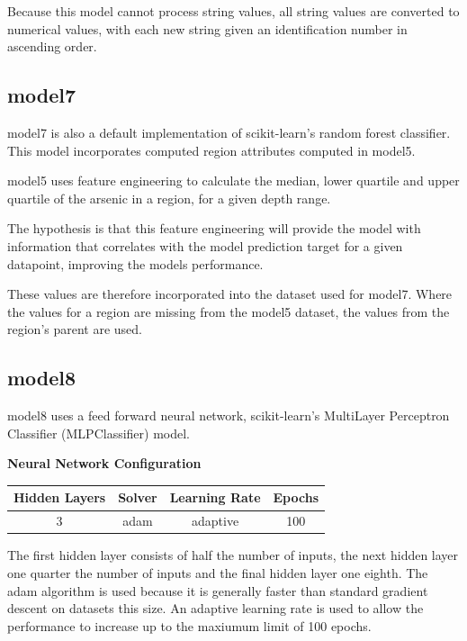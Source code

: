 Because this model cannot process string values, all string values are converted to numerical values, with each new string given an identification number in ascending order.

\subsection{model7}

model7 is also a default implementation of scikit-learn's random forest classifier. This model incorporates computed region attributes computed in model5.

model5 uses feature engineering to calculate the median, lower quartile and upper quartile of the arsenic in a region, for a given depth range.

The hypothesis is that this feature engineering will provide the model with information that correlates with the model prediction target for a given datapoint, improving the models performance.

These values are therefore incorporated into the dataset used for model7. Where the values for a region are missing from the model5 dataset, the values from the region's parent are used.

\subsection{model8}

model8 uses a feed forward neural network, scikit-learn's MultiLayer Perceptron Classifier (MLPClassifier) model.

\textbf{Neural Network Configuration}

\begin{center}
    \begin{tabular}{|c c c c|} 
         \hline
         Hidden Layers & Solver & Learning Rate & Epochs \\ [0.5ex] 
         \hline\hline
         3 & adam & adaptive & 100 \\ 
         \hline
    \end{tabular}
\end{center}

The first hidden layer consists of half the number of inputs, the next hidden layer one quarter the number of inputs and the final hidden layer one eighth. The adam algorithm is used because it is generally faster than standard gradient descent on datasets this size. An adaptive learning rate is used to allow the performance to increase up to the maxiumum limit of 100 epochs.

